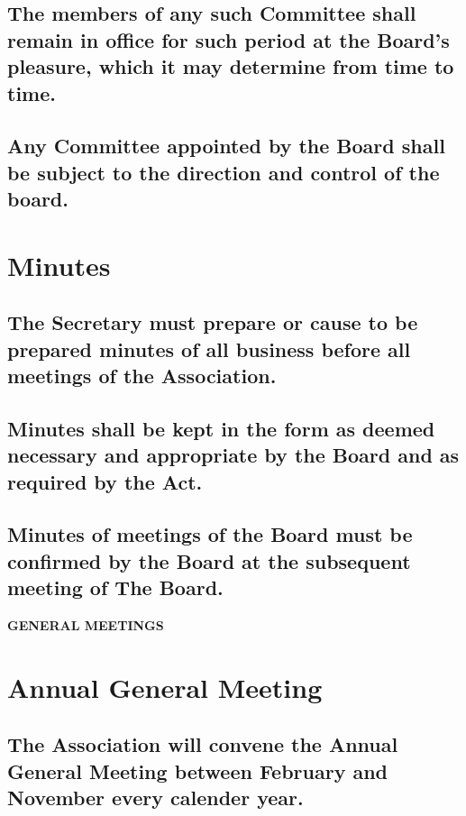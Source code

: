 \documentclass{article}
\newenvironment{subs}
  {\adjustwidth{2em}{0pt}}
  {\endadjustwidth}
\begin{document}
\begin{subs}
\begin{subs}
\begin{subs}
\subsection{The members of any such Committee shall remain in office for such period at the Board's pleasure, which it may determine from time to time.}
\subsection{Any Committee appointed by the Board shall be subject to the direction and control of the board.}
\end{subs}

\section{Minutes}
\begin{subs}
\subsection{The Secretary must prepare or cause to be prepared minutes of all business before all meetings of the Association.}
\subsection{Minutes shall be kept in the form as deemed necessary and appropriate by the Board and as required by the Act.}
\subsection{Minutes of meetings of the Board must be confirmed by the Board at the subsequent meeting of The Board.}
\end{subs}

\vspace{5mm}
{\large\bf GENERAL MEETINGS\par}
\hrulefill
\vspace{5mm}

\section{Annual General Meeting}
\begin{subs}
\subsection{The Association will convene the Annual General Meeting between February and November every calender year.}

\end{subs}
\end{subs}
\end{subs}
\end{document}

